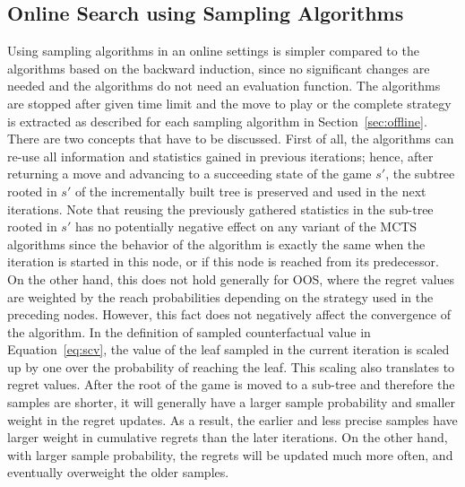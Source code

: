 \subsection{Online Search using Sampling Algorithms}

Using sampling algorithms in an online settings is simpler compared to the algorithms based on the backward induction, since no significant changes are needed and the algorithms do not need an evaluation function.
The algorithms are stopped after given time limit and the move to play or the complete strategy is extracted as described for each sampling algorithm in Section~\ref{sec:offline}.
There are two concepts that have to be discussed. 
First of all, the algorithms can re-use all information and statistics gained in previous iterations; hence, after returning a move and advancing to a succeeding state of the game $s'$, the subtree rooted in $s'$ of the incrementally built tree is preserved and used in the next iterations. 
Note that reusing the previously gathered statistics in the sub-tree rooted in $s'$ has no potentially negative effect on any variant of the MCTS algorithms since the behavior of the algorithm is exactly the same when the iteration is started in this node, or if this node is reached from its predecessor. On the other hand, this does not hold generally for OOS, where the regret values are weighted by the reach probabilities depending on the strategy used in the preceding nodes.  However, this fact does not negatively affect the convergence of the algorithm. In the definition of sampled counterfactual value in Equation~\ref{eq:scv}, the value of the leaf sampled in the current iteration is scaled up by one over the probability of reaching the leaf. This scaling also translates to regret values. After the root of the game is moved to a sub-tree and therefore the samples are shorter, it will generally have a larger sample probability and smaller weight in the regret updates. As a result, the earlier and less precise samples have larger weight in cumulative regrets than the later iterations. On the other hand, with larger sample probability, the regrets will be updated much more often, and eventually overweight the older samples.

